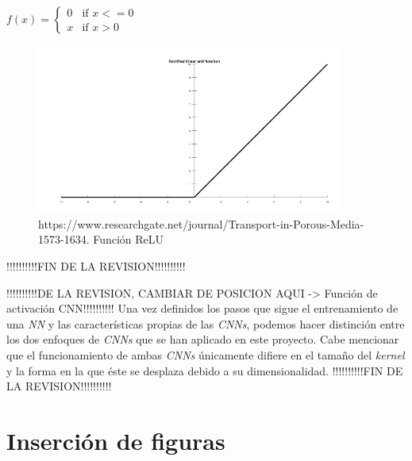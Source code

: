 \begin{enumerate}
            \begin{center}
                $f(x) = \left\{
                               \begin{array}{lr}
                                 0 & \text{if } x<=0\\
                                 x & \text{if } x>0
                               \end{array}
                        \right.$
            \end{center}

            \begin{figure}[h]
                \centering
                \includegraphics[width=10cm]{archivos/CNN/RELUImage}
                \caption{https://www.researchgate.net/journal/Transport-in-Porous-Media-1573-1634. Función ReLU}
                \label{RELUImage}
             \end{figure}
            !!!!!!!!!!FIN DE LA REVISION!!!!!!!!!!

            !!!!!!!!!!DE LA REVISION, CAMBIAR DE POSICION AQUI -> Función de activación CNN!!!!!!!!!!
            Una vez definidos los pasos que sigue el entrenamiento de una \textit{NN} y las características propias de las \textit{CNNs}, podemos hacer distinción entre los dos enfoques de \textit{CNNs} que se han aplicado en este proyecto. Cabe mencionar que el funcionamiento de ambas \textit{CNNs} únicamente difiere en el tamaño del \textit{kernel} y la forma en la que éste se desplaza debido a su dimensionalidad.
            !!!!!!!!!!FIN DE LA REVISION!!!!!!!!!!

            \cite{AutoSklearn}

    \end{enumerate}

\newpage
\section{Inserción de figuras}


